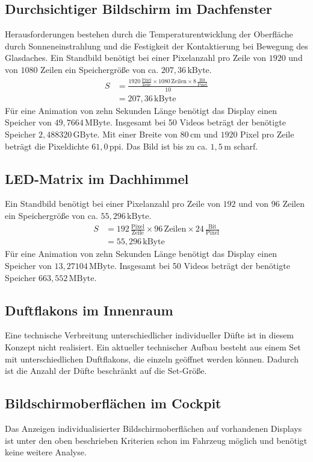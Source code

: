 \subsection{Durchsichtiger Bildschirm im Dachfenster} 
Herausforderungen bestehen durch die Temperaturentwicklung der Oberfläche durch Sonneneinstrahlung und die Festigkeit der Kontaktierung bei Bewegung des Glasdaches. 
Ein Standbild benötigt bei einer Pixelanzahl pro Zeile von $ 1920 $ und von $ 1080 $ Zeilen ein Speichergröße von ca. $ 207,36\,\mathrm{kByte}$. 
\begin{align}
	S &= \frac{1920\,\frac{\mathrm{Pixel}}{\mathrm{Zeile}}\times 1080\,\mathrm{Zeilen} \times 8\,\frac{\mathrm{Bit}}{\mathrm{Pixel}}}{10} \\
	&= 207,36\,\mathrm{kByte}
\end{align}
Für eine Animation von zehn Sekunden Länge benötigt das Display einen Speicher von $ 49,7664\,\mathrm{MByte}$.
Insgesamt bei 50 Videos beträgt der benötigte Speicher $ 2,488320\,\mathrm{GByte}$.
Mit einer Breite von $ 80\,\mathrm{cm} $ und $ 1920 $ Pixel pro Zeile beträgt die Pixeldichte $ 61,0\,\mathrm{ppi} $. Das Bild ist bis zu ca. $ 1,5\,\mathrm{m} $ scharf.
\subsection{LED-Matrix im Dachhimmel}
Ein Standbild benötigt bei einer Pixelanzahl pro Zeile von $ 192 $ und von $ 96 $ Zeilen ein Speichergröße von ca. $ 55,296\,\mathrm{kByte}$. 
\begin{align}
	S &= 192\,\frac{\mathrm{Pixel}}{\mathrm{Zeile}}\times 96\,\mathrm{Zeilen} \times 24\,\frac{\mathrm{Bit}}{\mathrm{Pixel}} \\
	&= 55,296\,\mathrm{kByte}
\end{align}
Für eine Animation von zehn Sekunden Länge benötigt das Display einen Speicher von $ 13,27104\,\mathrm{MByte}$.
Insgesamt bei 50 Videos beträgt der benötigte Speicher $ 663,552\,\mathrm{MByte}$.
\subsection{Duftflakons im Innenraum}
Eine technische Verbreitung unterschiedlicher individueller Düfte ist in diesem Konzept nicht realisiert. Ein aktueller technischer Aufbau besteht aus einem Set mit unterschiedlichen Duftflakons, die einzeln geöffnet werden können. Dadurch ist die Anzahl der Düfte beschränkt auf die Set-Größe.
\subsection{Bildschirmoberflächen im Cockpit}
Das Anzeigen individualisierter Bildschirmoberflächen auf vorhandenen Displays ist unter den oben beschrieben Kriterien schon im Fahrzeug möglich und benötigt keine weitere Analyse.
